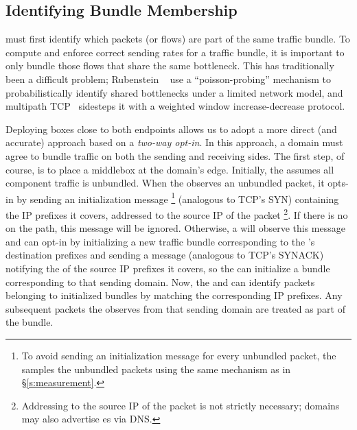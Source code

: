 \subsection{Identifying Bundle Membership}\label{s:design:membership}
\name must first identify which packets (or flows) are part of the same traffic bundle.
To compute and enforce correct sending rates for a traffic bundle, it is important to only bundle those flows that share the same bottleneck.
This has traditionally been a difficult problem; 
Rubenstein \etal~\cite{active-sharedbottlenecks} use a ``poisson-probing'' mechanism to probabilistically identify shared bottlenecks under a limited network model, and
multipath TCP~\cite{mptcp} sidesteps it with a weighted window increase-decrease protocol.

Deploying \name boxes close to both endpoints allows us to adopt a more direct (and accurate) approach based on a \emph{two-way opt-in}.
In this approach, a domain must agree to bundle traffic on both the sending and receiving sides.
The first step, of course, is to place a \name middlebox at the domain's edge.
Initially, the \inbox assumes all component traffic is unbundled.
When the \outbox observes an unbundled packet, it opts-in by sending an initialization message
\footnote{To avoid sending an initialization message for every unbundled packet, the \outbox samples the unbundled packets using the same mechanism as in \S\ref{s:measurement}.} 
(analogous to TCP's SYN) 
containing the IP prefixes it covers, addressed to the source IP of the packet
\footnote{Addressing to the source IP of the packet is not strictly necessary; domains may also advertise \inbox{}es via \eg DNS.}.
If there is no \inbox on the path, this message will be ignored.
Otherwise, a \inbox will observe this message and can opt-in by initializing a new traffic bundle corresponding to the \outbox's destination prefixes and sending a message (analogous to TCP's SYNACK) notifying the \outbox of the source IP prefixes it covers, so the \outbox can initialize a bundle corresponding to that sending domain.
Now, the \inbox and \outbox can identify packets belonging to initialized bundles by matching the corresponding IP prefixes.
Any subsequent packets the \outbox observes from that sending domain are treated as part of the bundle.


